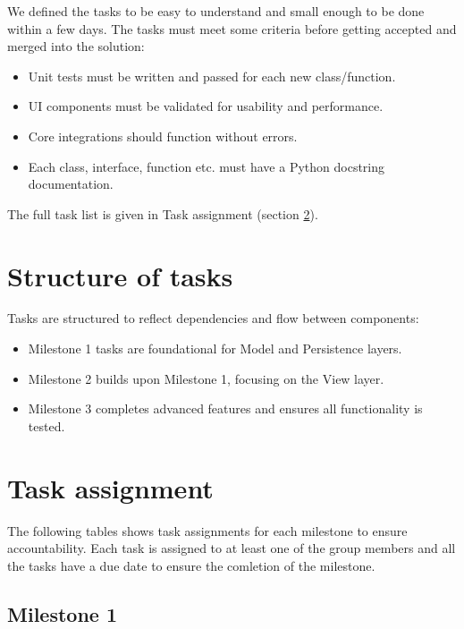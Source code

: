 \documentclass{article}
\begin{document}
We defined the tasks to be easy to understand and small enough to be done within a few days. The tasks must meet some criteria before getting accepted and merged into the solution:

\begin{itemize}
    \item Unit tests must be written and passed for each new class/function.
    \item UI components must be validated for usability and performance.
    \item Core integrations should function without errors.
    \item Each class, interface, function etc. must have a Python docstring documentation.
\end{itemize}

The full task list is given in Task assignment (section \ref{taskassignment}).

\section{Structure of tasks}

Tasks are structured to reflect dependencies and flow between components:

\begin{itemize}
    \item Milestone 1 tasks are foundational for Model and Persistence layers.
    \item Milestone 2 builds upon Milestone 1, focusing on the View layer.
    \item Milestone 3 completes advanced features and ensures all functionality is tested.
\end{itemize}

\newpage

\section{Task assignment}
\label{taskassignment}

The following tables shows task assignments for each milestone to ensure accountability. Each task is assigned to at least one of the group members and all the tasks have a due date to ensure the comletion of the milestone.

\subsection{Milestone 1}
\end{document}
